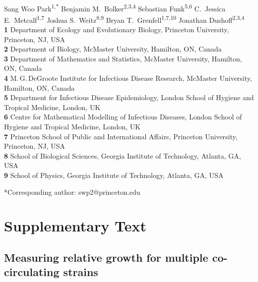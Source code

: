 \documentclass[12pt]{article}
\date{\today}
\begin{document}
\begin{flushleft}{
	\Large
	\textbf{}
}
\newline
\\
Sang Woo Park\textsuperscript{1,*}
Benjamin M.\ Bolker\textsuperscript{2,3,4}
Sebastian Funk\textsuperscript{5,6}
C.\ Jessica E.\ Metcalf\textsuperscript{1,7}
Joshua S.\ Weitz\textsuperscript{8,9}
Bryan T.\ Grenfell\textsuperscript{1,7,10}
Jonathan Dushoff\textsuperscript{2,3,4}
\\
\bigskip
\textbf{1} Department of Ecology and Evolutionary Biology, Princeton University, Princeton, NJ, USA
\\
\textbf{2} Department of Biology, McMaster University, Hamilton, ON, Canada
\\
\textbf{3} Department of Mathematics and Statistics, McMaster University, Hamilton, ON, Canada
\\
\textbf{4} M.\,G.\,DeGroote Institute for Infectious Disease Research, McMaster University, Hamilton, ON, Canada
\\
\textbf{5} Department for Infectious Disease Epidemiology, London School of Hygiene and Tropical Medicine, London, UK
\\
\textbf{6} Centre for Mathematical Modelling of Infectious Diseases, London School of Hygiene and Tropical Medicine, London, UK
\\
\textbf{7} Princeton School of Public and International Affairs, Princeton University, Princeton, NJ, USA
\\
\textbf{8} School of Biological Sciences, Georgia Institute of Technology, Atlanta, GA, USA
\\
\textbf{9} School of Physics, Georgia Institute of Technology, Atlanta, GA, USA
\\
\bigskip

*Corresponding author: swp2@princeton.edu
\bigskip

\end{flushleft}


\section{Supplementary Text}

\subsection{Measuring relative growth for multiple co-circulating strains}
\end{document}
